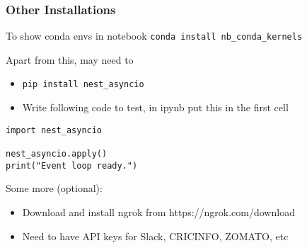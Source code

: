  \begin{frame}[fragile]\frametitle{Other Installations}
To show conda envs in notebook \lstinline|conda install nb_conda_kernels|

Apart from this, may need to
\begin{itemize}
\item \lstinline|pip install nest_asyncio|
\item Write following code to test, in ipynb put this in the first cell
\end{itemize}


\begin{lstlisting}
import nest_asyncio

nest_asyncio.apply()
print("Event loop ready.")
\end{lstlisting}

Some more (optional):
\begin{itemize}
\item Download and install ngrok from https://ngrok.com/download
\item Need to have API keys for Slack, CRICINFO, ZOMATO, etc
\end{itemize}
 
\end{frame}

